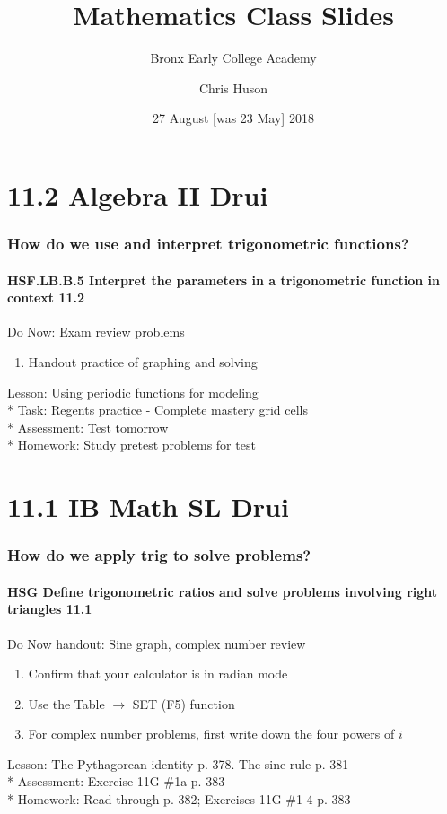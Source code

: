 \documentclass{beamer}
\title{Mathematics Class Slides}
\subtitle{Bronx Early College Academy}
\author{Chris Huson}
\date{27 August [was 23 May] 2018}
\begin{document}
\frame{\titlepage}


\section{11.2 Algebra II Drui}
\frame
{
  \frametitle{How do we use and interpret trigonometric functions?}
  \framesubtitle{HSF.LB.B.5 Interpret the parameters in a trigonometric function in context \qquad \alert{11.2}}

  \begin{block}{Do Now: Exam review problems}
  \begin{enumerate}
    \item Handout practice of graphing and solving%
    \end{enumerate}
  \end{block}
  Lesson: Using periodic functions for modeling\\*
  Task: Regents practice - Complete mastery grid cells\\*
  Assessment: Test \alert{tomorrow}\\*
  Homework: Study pretest problems for test\\}


\section{11.1 IB Math SL Drui}
\frame
{
  \frametitle{How do we apply trig to solve problems?}
  \framesubtitle{HSG Define trigonometric ratios and solve problems involving right triangles \qquad \alert{11.1}}

\begin{block}{Do Now handout: Sine graph, complex number review}
  \begin{enumerate}
    \item Confirm that your calculator is in radian mode
    \item Use the Table $\xrightarrow{}$ SET (F5) function
    \item For complex number problems, first write down the four powers of $i$
    \end{enumerate}
  \end{block}
  Lesson: The Pythagorean identity p. 378. The sine rule p. 381\\*
  Assessment: Exercise 11G \#1a p. 383\\*
  Homework: Read through p. 382; Exercises 11G \#1-4 p. 383\\
}
\end{document}
